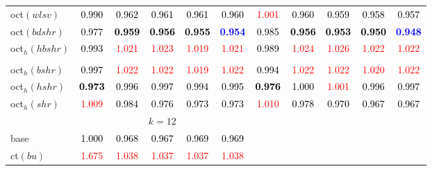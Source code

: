 \begin{tabular}[t]{l|>{}cccc>{}c|ccccc}
oct$(wlsv)$ & \textcolor{black}{0.990} & \textcolor{black}{0.962} & \textcolor{black}{0.961} & \textcolor{black}{0.961} & \textcolor{black}{0.960} & \textcolor{red}{1.001} & \textcolor{black}{0.960} & \textcolor{black}{0.959} & \textcolor{black}{0.958} & \textcolor{black}{0.957}\\
oct$(bdshr)$ & \textcolor{black}{0.977} & \textcolor{black}{\textbf{0.959}} & \textcolor{black}{\textbf{0.956}} & \textcolor{black}{\textbf{0.955}} & \textcolor{blue}{\textbf{0.954}} & \textcolor{black}{0.985} & \textcolor{black}{\textbf{0.956}} & \textcolor{black}{\textbf{0.953}} & \textcolor{black}{\textbf{0.950}} & \textcolor{blue}{\textbf{0.948}}\\
oct$_h(hbshr)$ & \textcolor{black}{0.993} & \textcolor{red}{1.021} & \textcolor{red}{1.023} & \textcolor{red}{1.019} & \textcolor{red}{1.021} & \textcolor{black}{0.989} & \textcolor{red}{1.024} & \textcolor{red}{1.026} & \textcolor{red}{1.022} & \textcolor{red}{1.022}\\[-1.5ex]
\hline\\[-1.5ex]
oct$_h(bshr)$ & \textcolor{black}{0.997} & \textcolor{red}{1.022} & \textcolor{red}{1.022} & \textcolor{red}{1.019} & \textcolor{red}{1.022} & \textcolor{black}{0.994} & \textcolor{red}{1.022} & \textcolor{red}{1.022} & \textcolor{red}{1.020} & \textcolor{red}{1.022}\\
oct$_h(hshr)$ & \textcolor{black}{\textbf{0.973}} & \textcolor{black}{0.996} & \textcolor{black}{0.997} & \textcolor{black}{0.994} & \textcolor{black}{0.995} & \textcolor{black}{\textbf{0.976}} & \textcolor{black}{1.000} & \textcolor{red}{1.001} & \textcolor{black}{0.996} & \textcolor{black}{0.997}\\
oct$_h(shr)$ & \textcolor{red}{1.009} & \textcolor{black}{0.984} & \textcolor{black}{0.976} & \textcolor{black}{0.973} & \textcolor{black}{0.973} & \textcolor{red}{1.010} & \textcolor{black}{0.978} & \textcolor{black}{0.970} & \textcolor{black}{0.967} & \textcolor{black}{0.967}\\
\addlinespace[0.3em]
\multicolumn{1}{c}{} & \multicolumn{5}{c}{\textbf{$k = 12$}} & \multicolumn{5}{c}{}\\
base & \textcolor{black}{1.000} & \textcolor{black}{0.968} & \textcolor{black}{0.967} & \textcolor{black}{0.969} & \textcolor{black}{0.969} &  &  &  &  & \\
ct$(bu)$ & \textcolor{red}{1.675} & \textcolor{red}{1.038} & \textcolor{red}{1.037} & \textcolor{red}{1.037} & \textcolor{red}{1.038} &  &  &  &  & \\

\end{tabular}
